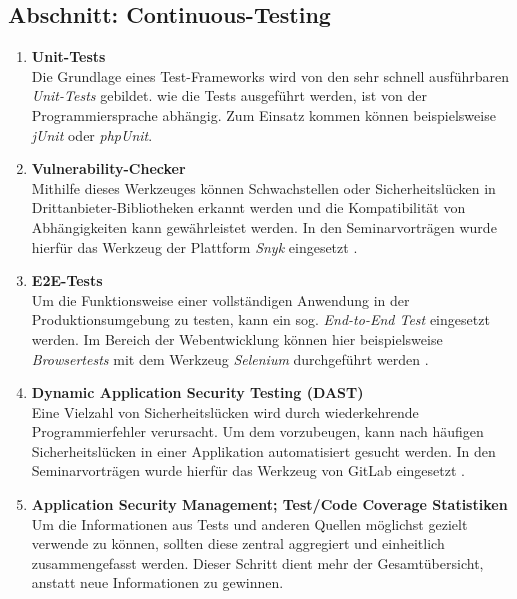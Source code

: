 \subsection{Abschnitt: Continuous-Testing}
\begin{enumerate}[resume]
    \itemsep-0.5em 
    \item \textbf{Unit-Tests}\label{Unit-Tests} \\
        Die Grundlage eines Test-Frameworks wird von den sehr schnell ausführbaren \emph{Unit-Tests} gebildet. wie die Tests ausgeführt werden, ist von der Programmiersprache abhängig. Zum Einsatz kommen können beispielsweise \emph{jUnit} oder \emph{phpUnit}.
    \item \textbf{Vulnerability-Checker}\label{Vulnerability-Checker} \\
        Mithilfe dieses Werkzeuges können Schwachstellen oder Sicherheitslücken in Drittan\-bieter-Bibliotheken erkannt werden und die Kompatibilität von Abhängigkeiten kann gewährleistet werden. In den Seminarvorträgen wurde hierfür das Werkzeug der Plattform \emph{Snyk} eingesetzt \cite{snykOpenSourceSecurity}.
    \item \textbf{E2E-Tests}\label{E2E-Tests} \\
        Um die Funktionsweise einer vollständigen Anwendung in der Produktionsumgebung zu testen, kann ein sog. \emph{End-to-End Test} eingesetzt werden. 
        Im Bereich der Webentwicklung können hier beispielsweise \emph{Browsertests} mit dem Werkzeug \emph{Selenium} durchgeführt werden \cite{seleniumSeleniumAutomatesBrowsers}.
    \item \textbf{Dynamic Application Security Testing (DAST)}\label{DAST} \\
        Eine Vielzahl von Sicherheitslücken wird durch wiederkehrende Programmierfehler verursacht. Um dem vorzubeugen, kann nach häufigen Sicherheitslücken in einer Applikation automatisiert gesucht werden. In den Seminarvorträgen wurde hierfür das Werkzeug von GitLab eingesetzt \cite{gitlabDynamicApplicationSecurity}.
    \item \textbf{Application Security Management; Test/Code Coverage Statistiken}\label{Test/Code Coverage Statistiken} \\
        Um die Informationen aus Tests und anderen Quellen möglichst gezielt verwende zu können, sollten diese zentral aggregiert und einheitlich zusammengefasst werden. 
        Dieser Schritt dient mehr der Gesamtübersicht, anstatt neue Informationen zu gewinnen.
\end{enumerate}

